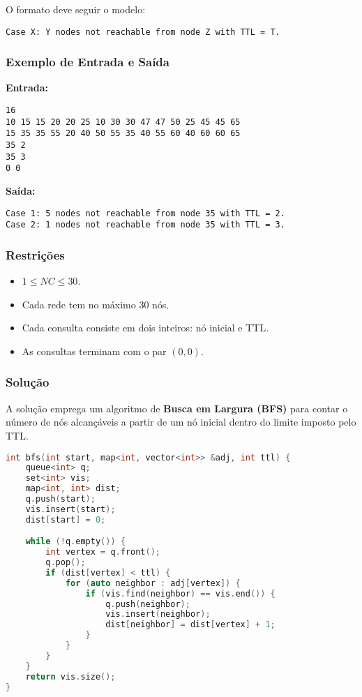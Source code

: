 O formato deve seguir o modelo:
\begin{verbatim}
Case X: Y nodes not reachable from node Z with TTL = T.
\end{verbatim}

\subsubsection*{Exemplo de Entrada e Saída}

\textbf{Entrada:}
\begin{verbatim}
16
10 15 15 20 20 25 10 30 30 47 47 50 25 45 45 65
15 35 35 55 20 40 50 55 35 40 55 60 40 60 60 65
35 2
35 3
0 0
\end{verbatim}

\textbf{Saída:}
\begin{verbatim}
Case 1: 5 nodes not reachable from node 35 with TTL = 2.
Case 2: 1 nodes not reachable from node 35 with TTL = 3.
\end{verbatim}

\subsubsection*{Restrições}

\begin{itemize}
    \item \( 1 \leq NC \leq 30 \).
    \item Cada rede tem no máximo 30 nós.
    \item Cada consulta consiste em dois inteiros: nó inicial e TTL.
    \item As consultas terminam com o par \( (0,0) \).
\end{itemize}

\subsubsection*{Solução}

A solução emprega um algoritmo de \textbf{Busca em Largura (BFS)} para contar o número de nós alcançáveis a partir de um nó inicial dentro do limite imposto pelo TTL.

\begin{lstlisting}[language=C++]
int bfs(int start, map<int, vector<int>> &adj, int ttl) {
    queue<int> q;
    set<int> vis;
    map<int, int> dist;
    q.push(start);
    vis.insert(start);
    dist[start] = 0;

    while (!q.empty()) {
        int vertex = q.front();
        q.pop();
        if (dist[vertex] < ttl) {
            for (auto neighbor : adj[vertex]) {
                if (vis.find(neighbor) == vis.end()) {
                    q.push(neighbor);
                    vis.insert(neighbor);
                    dist[neighbor] = dist[vertex] + 1;
                }
            }
        }
    }
    return vis.size();
}
\end{lstlisting}

